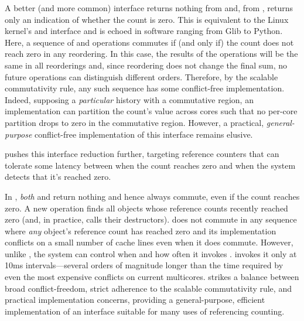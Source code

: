 A better (and more common) interface returns nothing from 
and, from , returns only an indication of whether the count
is zero.  This is equivalent to the Linux kernel's 
and  interface and is echoed in software
ranging from Glib to Python.  Here, a sequence of  and
 operations commutes if (and only if) the count does not
reach zero in any reordering.  In this case, the results of the
operations will be the same in all reorderings and, since reordering
does not change the final sum, no future operations can distinguish
different orders.  Therefore, by the scalable commutativity rule, any
such sequence has some conflict-free implementation.  Indeed,
supposing a \emph{particular} history with a commutative region, an
implementation can partition the count's value across cores such that
no per-core partition drops to zero in the commutative region.
However, a practical, \emph{general-purpose} conflict-free
implementation of this interface remains elusive.

 pushes this interface reduction further, targeting
reference counters that can tolerate some latency between when the
count reaches zero and when the system detects that it's reached zero.
%

In , \emph{both}  and  return nothing and
hence always commute, even if the count reaches zero.  A new
 operation finds all objects whose reference counts
recently reached zero (and, in practice, calls their destructors).
 does not commute in any sequence where \emph{any}
object's reference count has reached zero and its implementation
conflicts on a small number of cache lines even when it does commute.
%
However, unlike , the system can control when and how often
it invokes .
%
\sys invokes it
only at 10ms intervals---several orders of magnitude longer than the
time required by even the most expensive conflicts on current
multicores.
%
 strikes a balance between broad conflict-freedom, strict
adherence to the scalable commutativity rule, and practical
implementation concerns, providing a general-purpose, efficient
implementation of an interface suitable for many uses of referencing
counting.

